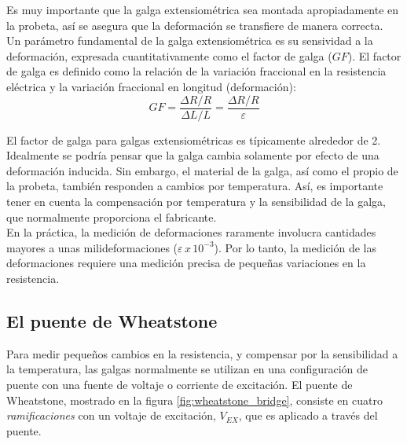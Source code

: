 Es muy importante que la galga extensiométrica sea montada apropiadamente en la probeta, así 
se asegura que la deformación se transfiere de manera correcta.\\

Un parámetro fundamental de la galga extensiométrica es su sensividad a la deformación, expresada 
cuantitativamente como el factor de galga ($GF$). El factor de galga es definido como la relación 
de la variación fraccional en la resistencia eléctrica y la variación fraccional en longitud (deformación):
~\cite{gageNI} \\

\begin{equation}
GF = \frac{\Delta R/R}{\Delta L/L} = \frac{\Delta R/R}{\varepsilon}
\end{equation}

El factor de galga para galgas extensiométricas es típicamente alrededor de 2. ~\cite{gageNI}\\

Idealmente se podría pensar que la galga cambia solamente por efecto de una deformación 
inducida. Sin embargo, el material de la galga, así como el propio de la probeta, también 
responden a cambios por temperatura. Así, es importante tener en cuenta la compensación 
por temperatura y la sensibilidad de la galga, que normalmente proporciona el fabricante. \\

En la práctica, la medición de deformaciones raramente involucra cantidades mayores a 
unas milideformaciones ($\varepsilon \, x \, 10^{-3}$). Por lo tanto, la medición 
de las deformaciones requiere una medición precisa de pequeñas variaciones en la resistencia. ~\cite{gageNI}

\subsection{El puente de Wheatstone}

Para medir pequeños cambios en la resistencia, y compensar por la sensibilidad a la temperatura, 
las galgas normalmente se utilizan en una configuración de puente con una fuente de voltaje o 
corriente de excitación. El puente de Wheatstone, mostrado en la figura \ref{fig:wheatstone_bridge}, 
consiste en cuatro \textit{ramificaciones} con un voltaje de excitación, $V_{EX}$, que es 
aplicado a través del puente. ~\cite{gageNI}\\

